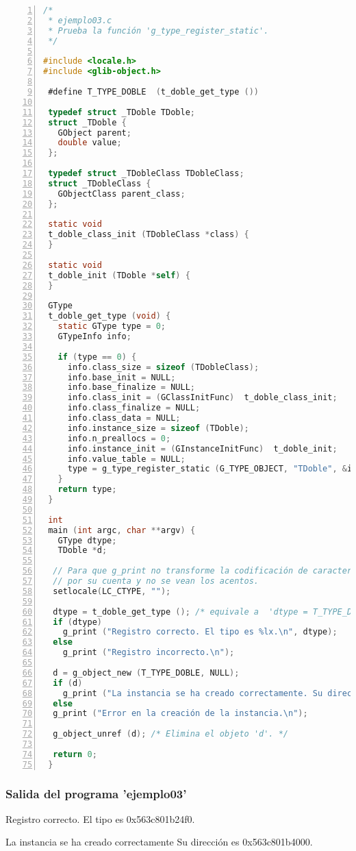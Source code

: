 \begin{lstlisting}[language=C, numbers=left]
/*
 * ejemplo03.c
 * Prueba la función 'g_type_register_static'.
 */

#include <locale.h>
#include <glib-object.h>
 
 #define T_TYPE_DOBLE  (t_doble_get_type ())
 
 typedef struct _TDoble TDoble;
 struct _TDoble {
   GObject parent;
   double value;
 };
 
 typedef struct _TDobleClass TDobleClass;
 struct _TDobleClass {
   GObjectClass parent_class;
 };
 
 static void
 t_doble_class_init (TDobleClass *class) {
 }
 
 static void
 t_doble_init (TDoble *self) {
 }
 
 GType
 t_doble_get_type (void) {
   static GType type = 0;
   GTypeInfo info;
 
   if (type == 0) {
     info.class_size = sizeof (TDobleClass);
     info.base_init = NULL;
     info.base_finalize = NULL;
     info.class_init = (GClassInitFunc)  t_doble_class_init;
     info.class_finalize = NULL;
     info.class_data = NULL;
     info.instance_size = sizeof (TDoble);
     info.n_preallocs = 0;
     info.instance_init = (GInstanceInitFunc)  t_doble_init;
     info.value_table = NULL;
     type = g_type_register_static (G_TYPE_OBJECT, "TDoble", &info, 0);
   }
   return type;
 }
 
 int
 main (int argc, char **argv) {
   GType dtype;
   TDoble *d;

  // Para que g_print no transforme la codificación de caracteres
  // por su cuenta y no se vean los acentos.
  setlocale(LC_CTYPE, "");
   
  dtype = t_doble_get_type (); /* equivale a  'dtype = T_TYPE_DOBLE' */
  if (dtype)
    g_print ("Registro correcto. El tipo es %lx.\n", dtype);
  else
    g_print ("Registro incorrecto.\n");
 
  d = g_object_new (T_TYPE_DOBLE, NULL);
  if (d)
    g_print ("La instancia se ha creado correctamente. Su dirección ess %p.\n", d);
  else
  g_print ("Error en la creación de la instancia.\n");
  
  g_object_unref (d); /* Elimina el objeto 'd'. */
  
  return 0;
 }
 \end{lstlisting}

 \subsubsection{Salida del programa 'ejemplo03'}
\textsf{Registro correcto. El tipo es 0x563c801b24f0.}\par
\textsf{La instancia se ha creado correctamente Su dirección es 0x563c801b4000.}\par

